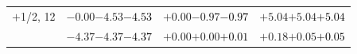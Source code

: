 \documentclass[compress]{beamer}
\begin{document}
\begin{frame}
\begin{tabular}{r | c | c | c}
$+$1/2, 12 & $-0.00$\hspace{0.1 cm}$-4.53$\hspace{0.1 cm}\textcolor{black}{$-4.53$} & $+0.00$\hspace{0.1 cm}$-0.97$\hspace{0.1 cm}\textcolor{black}{$-0.97$} & $+5.04$\hspace{0.1 cm}$+5.04$\hspace{0.1 cm}\textcolor{black}{$+5.04$} \\
           & $-4.37$\hspace{0.1 cm}$-4.37$\hspace{0.1 cm}\textcolor{black}{$-4.37$} & $+0.00$\hspace{0.1 cm}$+0.00$\hspace{0.1 cm}\textcolor{black}{$+0.01$} & $+0.18$\hspace{0.1 cm}$+0.05$\hspace{0.1 cm}\textcolor{black}{$+0.05$} \\
\end{tabular}
\end{frame}
\end{document}
